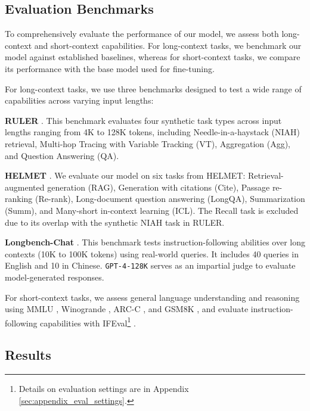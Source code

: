 \subsection{Evaluation Benchmarks}
To comprehensively evaluate the performance of our model, we assess both long-context and short-context capabilities. For long-context tasks, we benchmark our model against established baselines, whereas for short-context tasks, we compare its performance with the base model used for fine-tuning.

For long-context tasks, we use three benchmarks designed to test a wide range of capabilities across varying input lengths:

\textbf{RULER} \citep{hsieh2024ruler}. This benchmark evaluates four synthetic task types across input lengths ranging from 4K to 128K tokens, including Needle-in-a-haystack (NIAH) retrieval, Multi-hop Tracing with Variable Tracking (VT), Aggregation (Agg), and Question Answering (QA).

\textbf{HELMET} \citep{yen2025helmet}. We evaluate our model on six tasks from HELMET: Retrieval-augmented generation (RAG), Generation with citations (Cite), Passage re-ranking (Re-rank), Long-document question answering (LongQA), Summarization (Summ), and Many-short in-context learning (ICL). The Recall task is excluded due to its overlap with the synthetic NIAH task in RULER.

\textbf{Longbench-Chat} \citep{bai2024longalign}. This benchmark tests instruction-following abilities over long contexts (10K to 100K tokens) using real-world queries. It includes 40 queries in English and 10 in Chinese. \texttt{GPT-4-128K} serves as an impartial judge to evaluate model-generated responses.

For short-context tasks, we assess general language understanding and reasoning using MMLU \citep{hendrycksmeasuring}, Winogrande \citep{sakaguchi2020winogrande}, ARC-C \citep{clark2018think}, and GSM8K \citep{cobbe2021gsm8k}, and evaluate instruction-following capabilities with IFEval\footnote{Details on evaluation settings are in Appendix \ref{sec:appendix_eval_settings}.} \citep{zhou2023instruction}.

\subsection{Results}

